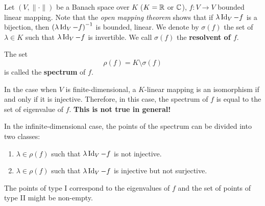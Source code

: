 \begin{definitionenv}
    Let $(V,\|\cdot\|)$ be a Banach space over $K$ ($K = \mathbb{R} $ or $\mathbb{C}$), $f:V\rightarrow V$ bounded linear mapping.
    Note that the \textit{open mapping theorem} shows that if $\lambda \operatorname{\mathrm{Id}}_{V}-f$ is a bijection, then $\left(\lambda\operatorname{\mathrm{Id}}_{V} - f\right)^{-1}$ is bounded, linear.
    We denote by $\sigma (f)$ the set of $\lambda \in K$ such that $\lambda\operatorname{\mathrm{Id}}_{V} - f$ is invertible.
    We call $\sigma(f)$ the \textbf{resolvent of $f$}.

    The set 
    $$ \rho(f) = K\setminus \sigma(f)$$
    is called the \textbf{spectrum} of $f$.
    
    \quad In the case when $V$ is finite-dimensional, a $K$-linear mapping is an isomorphism if and only if it is injective.
    Therefore, in this case, the spectrum of $f$ is equal to the set of eigenvalue of $f$.
    {\bf This is not true in general!}

    \quad In the infinite-dimensional case, the points of the spectrum can be divided into two classes:
    \begin{enumerate}[label= \Roman*.]
        \item $\lambda \in \rho(f)$ such that $\lambda \operatorname{\mathrm{Id}}_{V} - f$ is not injective.
        \item $\lambda \in \rho(f)$ such that $\lambda \operatorname{\mathrm{Id}}_{V} - f$ is injective but not surjective.
    \end{enumerate}
    The points of type I correspond to the eigenvalues of $f$ and the set of points of type II might be non-empty.
\end{definitionenv}

